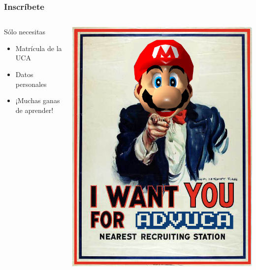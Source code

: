 \documentclass{beamer}
\begin{document}
\begin{frame}
	\frametitle{Inscríbete}
	
	\begin{columns}[c]
		\column{150pt}
		\begin{block}{Sólo necesitas}
            \begin{itemize}
                \item Matrícula de la UCA
				\item Datos personales
				\item ¡Muchas ganas de aprender!
            \end{itemize}            
        \end{block}        
		\column{150pt}
		\begin{center}
			\includegraphics[scale=0.22]{img/iwantyou.jpg}
		\end{center}
	\end{columns} 
	
\end{frame}
\end{document}
